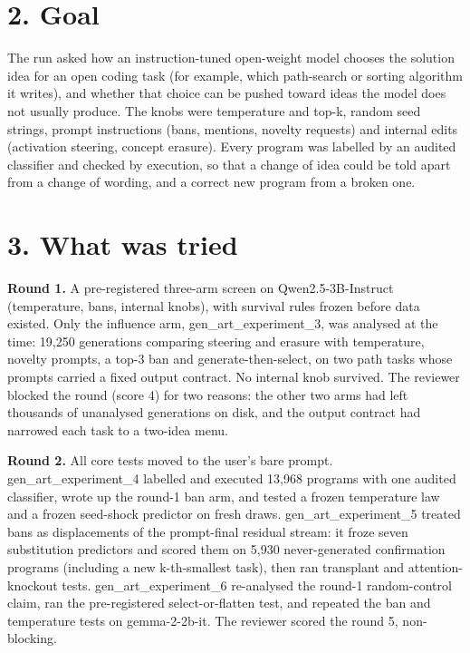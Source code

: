 \documentclass[10pt,letterpaper]{article}
\begin{document}
\section*{2. Goal}

The run asked how an instruction-tuned open-weight model chooses the solution idea for an open coding task (for example, which path-search or sorting algorithm it writes), and whether that choice can be pushed toward ideas the model does not usually produce. The knobs were temperature and top-k, random seed strings, prompt instructions (bans, mentions, novelty requests) and internal edits (activation steering, concept erasure). Every program was labelled by an audited classifier and checked by execution, so that a change of idea could be told apart from a change of wording, and a correct new program from a broken one.

\section*{3. What was tried}

\textbf{Round 1.} A pre-registered three-arm screen on Qwen2.5-3B-Instruct (temperature, bans, internal knobs), with survival rules frozen before data existed. Only the influence arm, gen\_art\_experiment\_3, was analysed at the time: 19,250 generations comparing steering and erasure with temperature, novelty prompts, a top-3 ban and generate-then-select, on two path tasks whose prompts carried a fixed output contract. No internal knob survived. The reviewer blocked the round (score 4) for two reasons: the other two arms had left thousands of unanalysed generations on disk, and the output contract had narrowed each task to a two-idea menu.

\textbf{Round 2.} All core tests moved to the user's bare prompt. gen\_art\_experiment\_4 labelled and executed 13,968 programs with one audited classifier, wrote up the round-1 ban arm, and tested a frozen temperature law and a frozen seed-shock predictor on fresh draws. gen\_art\_experiment\_5 treated bans as displacements of the prompt-final residual stream: it froze seven substitution predictors and scored them on 5,930 never-generated confirmation programs (including a new k-th-smallest task), then ran transplant and attention-knockout tests. gen\_art\_experiment\_6 re-analysed the round-1 random-control claim, ran the pre-registered select-or-flatten test, and repeated the ban and temperature tests on gemma-2-2b-it. The reviewer scored the round 5, non-blocking.
\end{document}
